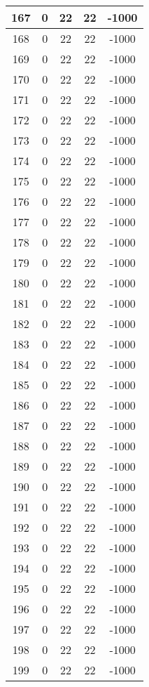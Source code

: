 \documentclass[letterpaper, 12pt]{article}
\begin{document}
\begin{longtable}{|c|c|c|c|c|}
\hline
167 & 0 & 22 & 22 & -1000 \\
\hline
168 & 0 & 22 & 22 & -1000 \\
\hline
169 & 0 & 22 & 22 & -1000 \\
\hline
170 & 0 & 22 & 22 & -1000 \\
\hline
171 & 0 & 22 & 22 & -1000 \\
\hline
172 & 0 & 22 & 22 & -1000 \\
\hline
173 & 0 & 22 & 22 & -1000 \\
\hline
174 & 0 & 22 & 22 & -1000 \\
\hline
175 & 0 & 22 & 22 & -1000 \\
\hline
176 & 0 & 22 & 22 & -1000 \\
\hline
177 & 0 & 22 & 22 & -1000 \\
\hline
178 & 0 & 22 & 22 & -1000 \\
\hline
179 & 0 & 22 & 22 & -1000 \\
\hline
180 & 0 & 22 & 22 & -1000 \\
\hline
181 & 0 & 22 & 22 & -1000 \\
\hline
182 & 0 & 22 & 22 & -1000 \\
\hline
183 & 0 & 22 & 22 & -1000 \\
\hline
184 & 0 & 22 & 22 & -1000 \\
\hline
185 & 0 & 22 & 22 & -1000 \\
\hline
186 & 0 & 22 & 22 & -1000 \\
\hline
187 & 0 & 22 & 22 & -1000 \\
\hline
188 & 0 & 22 & 22 & -1000 \\
\hline
189 & 0 & 22 & 22 & -1000 \\
\hline
190 & 0 & 22 & 22 & -1000 \\
\hline
191 & 0 & 22 & 22 & -1000 \\
\hline
192 & 0 & 22 & 22 & -1000 \\
\hline
193 & 0 & 22 & 22 & -1000 \\
\hline
194 & 0 & 22 & 22 & -1000 \\
\hline
195 & 0 & 22 & 22 & -1000 \\
\hline
196 & 0 & 22 & 22 & -1000 \\
\hline
197 & 0 & 22 & 22 & -1000 \\
\hline
198 & 0 & 22 & 22 & -1000 \\
\hline
199 & 0 & 22 & 22 & -1000 \\
\hline
\end{longtable}
\end{document}
